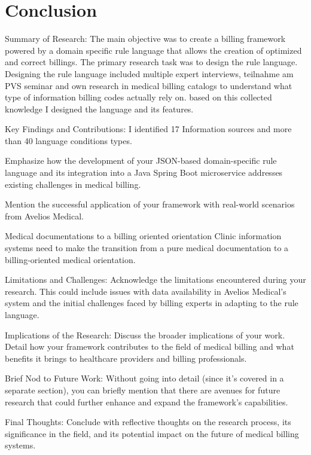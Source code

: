 \section{Conclusion}\label{sec:conclusion}
Summary of Research:
The main objective was to create a billing framework powered by a domain specific rule language that allows the creation of optimized and correct billings.
The primary research task was to design the rule language.
Designing the rule language included multiple expert interviews, teilnahme am PVS seminar and own research in medical billing catalogs to understand what type of information billing codes actually rely on.
based on this collected knowledge I designed the language and its features.

Key Findings and Contributions:
I identified 17 Information sources and more than 40 language conditions types.


Emphasize how the development of your JSON-based domain-specific rule language and its integration into a Java Spring Boot microservice addresses existing challenges in medical billing.

Mention the successful application of your framework with real-world scenarios from Avelios Medical.

Medical documentations to a billing oriented orientation
Clinic information systems need to make the transition from a pure medical documentation to a billing-oriented medical orientation.


Limitations and Challenges:
Acknowledge the limitations encountered during your research. This could include issues with data availability in Avelios Medical's system and the initial challenges faced by billing experts in adapting to the rule language.

Implications of the Research:
Discuss the broader implications of your work.
Detail how your framework contributes to the field of medical billing and what benefits it brings to healthcare providers and billing professionals.

Brief Nod to Future Work:
Without going into detail (since it's covered in a separate section), you can briefly mention that there are avenues for future research that could further enhance and expand the framework's capabilities.

Final Thoughts:
Conclude with reflective thoughts on the research process, its significance in the field, and its potential impact on the future of medical billing systems.
